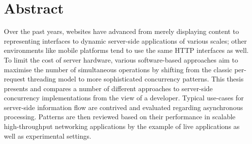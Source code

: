 \chapter{Abstract}

Over the past years, websites have advanced from merely displaying content to representing interfaces to dynamic server-side applications of various scales; other environments like mobile platforms tend to use the same HTTP interfaces as well. To limit the cost of server hardware, various software-based approaches aim to maximise the number of simultaneous operations by shifting from the classic per-request threading model to more sophisticated concurrency patterns. This thesis presents and compares a number of different approaches to server-side concurrency implementations from the view of a developer. Typical use-cases for server-side information flow are contrived and evaluated regarding asynchronous processing. Patterns are then reviewed based on their performance in scalable high-throughput networking applications by the example of live applications as well as experimental settings.